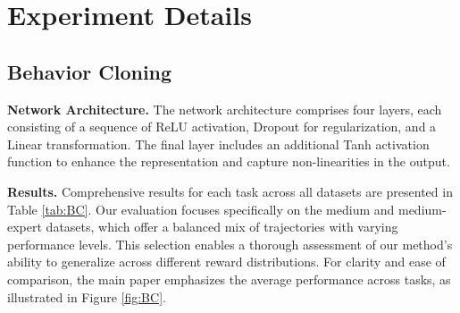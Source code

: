 \section{Experiment Details}
\label{sec:ExpDetail}

\subsection{Behavior Cloning}

\textbf{Network Architecture.} The network architecture comprises four layers, each consisting of a sequence of ReLU activation, Dropout for regularization, and a Linear transformation. The final layer includes an additional Tanh activation function to enhance the representation and capture non-linearities in the output.

\textbf{Results.} 
Comprehensive results for each task across all datasets are presented in Table \ref{tab:BC}. Our evaluation focuses specifically on the medium and medium-expert datasets, which offer a balanced mix of trajectories with varying performance levels. This selection enables a thorough assessment of our method's ability to generalize across different reward distributions.
For clarity and ease of comparison, the main paper emphasizes the average performance across tasks, as illustrated in Figure \ref{fig:BC}. 

